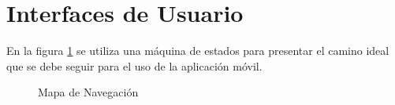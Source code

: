 \section{Interfaces de Usuario}
En la figura \ref{fig:mapaDeNavegacion} se utiliza una máquina de estados para presentar el camino ideal que se debe seguir para el uso de la aplicación móvil.

\begin{figure}[hbtp!]
	\begin{center}
		\caption{Mapa de Navegación}
		\label{fig:mapaDeNavegacion}
	\end{center}
\end{figure}

%


